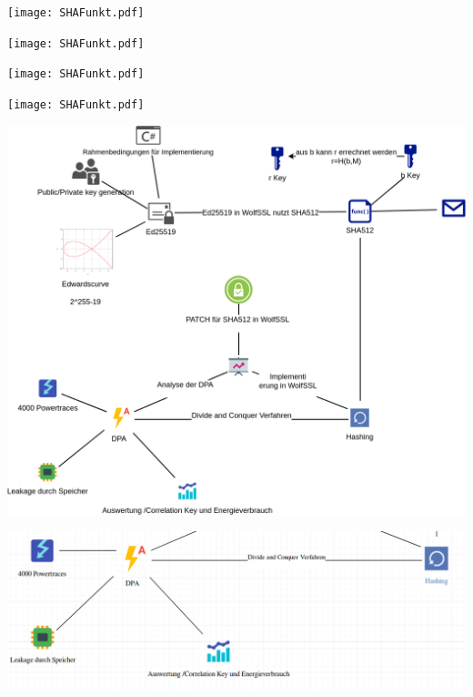 \documentclass[
  10pt,
  ignorenonframetext,
  aspectratio=43,
]{beamer}
\begin{document}
\begin{frame}{}
\protect\hypertarget{section-17}{}
\texttt{[image: SHAFunkt.pdf]}
\end{frame}

\begin{frame}{}
\protect\hypertarget{section-18}{}
\texttt{[image: SHAFunkt.pdf]}
\end{frame}

\begin{frame}{}
\protect\hypertarget{section-19}{}
\texttt{[image: SHAFunkt.pdf]}
\end{frame}

\begin{frame}{}
\protect\hypertarget{section-20}{}
\texttt{[image: SHAFunkt.pdf]}
\end{frame}

\begin{frame}{}
\protect\hypertarget{section-21}{}
\includegraphics{Abbildungen/ITSEC(1)_res.png}
\end{frame}

\begin{frame}{}
\protect\hypertarget{section-22}{}
\includegraphics{Abbildungen/Punkt4.png}
\end{frame}
\end{document}
